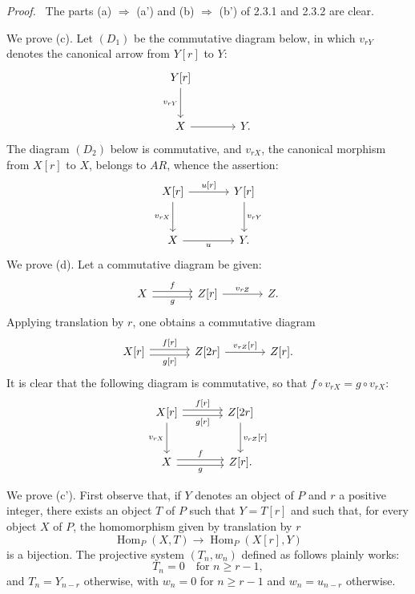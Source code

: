 \documentclass[11pt]{article}
\newenvironment{prooftext}[1][Proof]{\par\noindent\emph{#1.}\ }{\par\medskip}
\DeclareMathOperator{\Hom}{Hom}
\providecommand{\Hom}{\operatorname{Hom}}
\begin{document}
\begin{prooftext}[Proof]
The parts (a) $\Rightarrow$ (a') and (b) $\Rightarrow$ (b') of 2.3.1 and 2.3.2 are clear.

We prove (c). Let $(D_1)$ be the commutative diagram below, in which $v_{rY}$ denotes the canonical arrow from $Y[r]$ to $Y$:
\[
\begin{tikzcd}[column sep=large,row sep=large]
Y[r] \arrow[d,"{v_{rY}}"']\\
X \arrow[r] & Y .
\end{tikzcd}
\]
The diagram $(D_2)$ below is commutative, and $v_{rX}$, the canonical morphism from $X[r]$ to $X$, belongs to $AR$, whence the assertion:
\[
\begin{tikzcd}[column sep=large,row sep=large]
X[r] \arrow[r,"{u[r]}"] \arrow[d,"{v_{rX}}"'] & Y[r] \arrow[d,"{v_{rY}}"]\\
X \arrow[r,"u"'] & Y .
\end{tikzcd}
\]
We prove (d). Let a commutative diagram be given:
\[
\begin{tikzcd}[column sep=large]
X \arrow[r,shift left,"f"] \arrow[r,shift right,"g"'] & Z[r] \arrow[r,"{v_{rZ}}"] & Z .
\end{tikzcd}
\]
Applying translation by $r$, one obtains a commutative diagram
\[
\begin{tikzcd}[column sep=large]
X[r] \arrow[r,shift left,"{f[r]}"] \arrow[r,shift right,"{g[r]}"'] & Z[2r] \arrow[r,"{v_{rZ}[r]}"] & Z[r].
\end{tikzcd}
\]
It is clear that the following diagram is commutative, so that $f\circ v_{rX}=g\circ v_{rX}$:
\[
\begin{tikzcd}[column sep=large,row sep=large]
X[r] \arrow[r,shift left,"{f[r]}"] \arrow[r,shift right,"{g[r]}"'] \arrow[d,"{v_{rX}}"'] & Z[2r] \arrow[d,"{v_{rZ}[r]}"]\\
X \arrow[r,shift left,"f"] \arrow[r,shift right,"g"'] & Z[r] .
\end{tikzcd}
\]

We prove (c'). First observe that, if $Y$ denotes an object of $P$ and $r$ a positive integer, there exists an object $T$ of $P$ such that $Y=T[r]$ and such that, for every object $X$ of $P$, the homomorphism given by translation by $r$
\[
\Hom_P(X,T)\longrightarrow\Hom_P(X[r],Y)
\]
is a bijection. The projective system $(T_n,w_n)$ defined as follows plainly works:
\[
T_n=0\quad\text{for } n\ge r-1,
\]
and $T_n=Y_{n-r}$ otherwise, with $w_n=0$ for $n\ge r-1$ and $w_n=u_{n-r}$ otherwise.


\end{prooftext}
\end{document}
